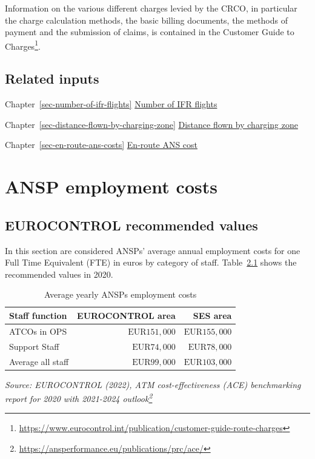 \documentclass[
  11pt,
  a4paper,
]{book}
\DeclareRobustCommand{\href}[2]{#2\footnote{\url{#1}}}
\begin{document}
Information on the various different charges levied by the CRCO, in
particular the charge calculation methods, the basic billing documents,
the methods of payment and the submission of claims, is contained in the
\href{https://www.eurocontrol.int/publication/customer-guide-route-charges}{Customer
Guide to Charges}.

\hypertarget{related-inputs-21}{%
\section{Related inputs}\label{related-inputs-21}}

Chapter~\ref{sec-number-of-ifr-flights}
\protect\hyperlink{sec-number-of-ifr-flights}{Number of IFR flights}

Chapter~\ref{sec-distance-flown-by-charging-zone}
\protect\hyperlink{sec-distance-flown-by-charging-zone}{Distance flown
by charging zone}

Chapter~\ref{sec-en-route-ans-costs}
\protect\hyperlink{sec-en-route-ans-costs}{En-route ANS cost}

\hypertarget{sec-ansp-employment-cost}{%
\chapter{ANSP employment costs}\label{sec-ansp-employment-cost}}

\hypertarget{eurocontrol-recommended-values-26}{%
\section{EUROCONTROL recommended
values}\label{eurocontrol-recommended-values-26}}

In this section are considered ANSPs' average annual employment costs
for one Full Time Equivalent (FTE) in euros by category of staff.
Table~\ref{tbl-ansp-employment-cost-general} shows the recommended
values in 2020.

\hypertarget{tbl-ansp-employment-cost-general}{}
\setlength{\LTpost}{0mm}
\begin{longtable}{lrr}
\caption{\label{tbl-ansp-employment-cost-general}Average yearly ANSPs employment costs }\tabularnewline

\toprule
Staff function & EUROCONTROL area & SES area \\ 
\midrule
ATCOs in OPS & $\text{EUR}151,000$ & $\text{EUR}155,000$ \\ 
Support Staff & $\text{EUR}74,000$ & $\text{EUR}78,000$ \\ 
Average all staff & $\text{EUR}99,000$ & $\text{EUR}103,000$ \\ 
\bottomrule
\end{longtable}
\begin{minipage}{\linewidth}
\emph{Source: \href{https://ansperformance.eu/publications/prc/ace/}{EUROCONTROL (2022), ATM cost-effectiveness (ACE) benchmarking report for 2020 with 2021-2024 outlook}}\\
\end{minipage}
\end{document}
